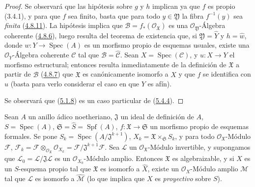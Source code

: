 \begin{proof}
Se observará que las hipótesis sobre $g$ y $h$ implican ya que $f$ es propio
(3.4.1), y para que $f$ sea finito, basta que para todo $y\in\mathfrak Y$ la
fibra $f^{-1}(y)$ sea \emph{finita} (\hyperref[III.4.8.11-fr]{4.8.11}). La hipótesis
implica que $\mathcal B=f_*(\mathcal O_{\mathfrak X})$ es una
$\mathcal O_{\mathfrak Y}$-Álgebra coherente
(\hyperref[III.4.8.6-fr]{4.8.6}), luego resulta del teorema de existencia que, si
$\mathfrak Y=\widehat Y$ y $h=\widehat w$, donde
$w:Y\to\operatorname{Spec}(A)$ es un morfismo propio de esquemas usuales,
existe una $\mathcal O_Y$-Álgebra coherente $\mathcal C$ tal que
$\mathcal B=\widehat{\mathcal C}$. Sean $X=\operatorname{Spec}(\mathcal C)$, y
$u:X\to Y$ el morfismo estructural; entonces resulta inmediatamente de la definición de
$\mathfrak X$ a partir de $\mathcal B$
(\hyperref[III.4.8.7-fr]{4.8.7}) que $\mathfrak X$ es canónicamente isomorfo a
$\widehat X$ y que $f$ se identifica con $\widehat u$ (basta para verlo
considerar el caso en que $Y$ es afín).

Se observará que (\hyperref[III.5.1.8-fr]{5.1.8}) es un caso particular de
(\hyperref[III.5.4.4-fr]{5.4.4}).
\end{proof}

\begin{theorem}[5.4.5]
\label{III.5.4.5-fr}
Sean $A$ un anillo ádico noetheriano, $\mathfrak J$ un ideal de definición de
$A$, $S=\operatorname{Spec}(A)$,
$\mathfrak S=\widehat S=\operatorname{Spf}(A)$,
$f:\mathfrak X\to\mathfrak S$ un morfismo propio de esquemas formales. Se pone
$S_k=\operatorname{Spec}(A/\mathfrak J^{k+1})$,
$X_k=\mathfrak X\times_{\mathfrak S}S_k$, y para todo
$\mathcal O_{\mathfrak X}$-Módulo $\mathcal F$,
$\mathcal F_k=\mathcal F\otimes_{\mathcal O_{\mathfrak X}}\mathcal O_{X_k}
=\mathcal F/\mathfrak J^{k+1}\mathcal F$.
Sea $\mathcal L$ un $\mathcal O_{\mathfrak X}$-Módulo invertible, y supongamos
que $\mathcal L_0=\mathcal L/\mathfrak J\mathcal L$ es un
$\mathcal O_{X_0}$-Módulo amplio. Entonces $\mathfrak X$ es algebraizable, y si
$X$ es un $S$-esquema propio tal que $\mathfrak X$ es isomorfo a
$\widehat X$, existe un $\mathcal O_X$-Módulo amplio $\mathcal M$ tal que
$\mathcal L$ es isomorfo a $\widehat{\mathcal M}$ \textup{(lo que implica que
$X$ es \emph{proyectivo} sobre $S$)}.
\end{theorem}

